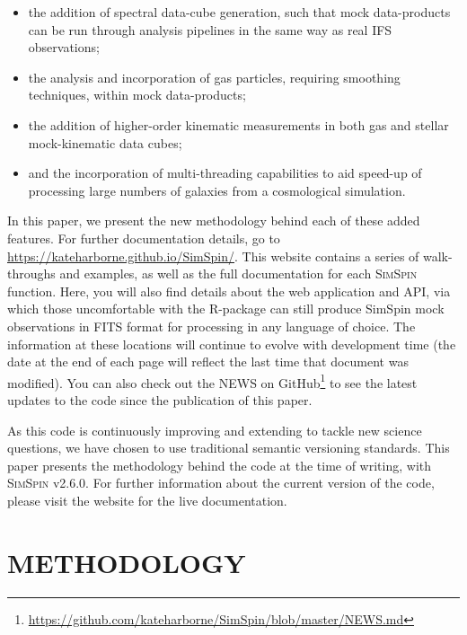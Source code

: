 \documentclass[
  journal=pasa,
  manuscript=research-paper, %
  year=2020,
  volume=37,
]{cup-journal}
\newcommand{\simspin}[1]{\textsc{SimSpin}#1} %
\newcommand{\ssversion}[1]{v2.6.0#1}
\begin{document}
\begin{itemize}
    \item the addition of spectral data-cube generation, such that mock data-products can be run through analysis pipelines in the same way as real IFS observations;
    \item the analysis and incorporation of gas particles, requiring smoothing techniques, within mock data-products;  
    \item the addition of higher-order kinematic measurements in both gas and stellar mock-kinematic data cubes;
    \item and the incorporation of multi-threading capabilities to aid speed-up of processing large numbers of galaxies from a cosmological simulation. 
\end{itemize}

In this paper, we present the new methodology behind each of these added features. 
For further documentation details, go to \url{https://kateharborne.github.io/SimSpin/}. 
This website contains a series of walk-throughs and examples, as well as the full documentation for each \simspin{} function. 
Here, you will also find details about the web application and API, via which those uncomfortable with the R-package can still produce SimSpin mock observations in FITS format for processing in any language of choice.
The information at these locations will continue to evolve with development time (the date at the end of each page will reflect the last time that document was modified).
You can also check out the NEWS on GitHub\footnote{\url{https://github.com/kateharborne/SimSpin/blob/master/NEWS.md}} to see the latest updates to the code since the publication of this paper. 

As this code is continuously improving and extending to tackle new science questions, we have chosen to use traditional semantic versioning standards. 
This paper presents the methodology behind the code at the time of writing, with \simspin{} \ssversion. 
For further information about the current version of the code, please visit the website for the live documentation. 

\section{METHODOLOGY}
\end{document}
